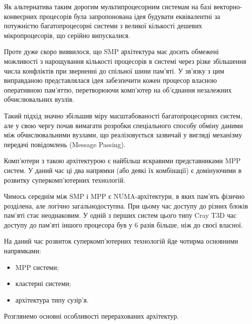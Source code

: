 Як альтернатива таким дорогим мультипроцесорним системам на базі век\-тор\-но-кон\-ве\-єр\-них процесорів була запропонована ідея будувати еквівалентні за потужністю багатопроцесорні системи з великої кількості дешевих мікропроцесорів, що серійно випускалися.

Проте дуже скоро виявилося, що SMP архітектура має досить обмежені можливості з нарощування кількості процесорів в системі через різке збільшення числа конфліктів при зверненні до спільної шини пам'яті.   
У зв'язку з цим виправданою представлялася ідея забезпечити кожен процесор власною оперативною пам'яттю, перетворюючи комп'ютер на об'єднання незалежних обчислювальних вузлів.   

Такий підхід значно збільшив міру масштабованості багатопроцесорних систем, але у свою чергу почав вимагати розробки спеціального способу обміну даними між обчислювальними вузлами, що реалізовується зазвичай у вигляді механізму передачі повідомлень (Message Passing).

Комп'ютери з такою архітектурою є найбільш яскравими представниками MPP систем. У даний час ці два напрямки (або деякі їх комбінації) є домінуючими в розвитку суперкомп'ютерних технологій.  

Чимось середнім між SMP і MPP є NUMA-архітектури, в яких пам'ять фізично розділена, але логічно загальнодоступна. При цьому час доступу до різних блоків пам'яті стає неоднаковим. У одній з перших систем цього типу Cray T3D час доступу до пам'яті іншого процесора був у 6 разів більше, ніж до своєї власної.

На даний час розвиток суперкомп'ютерних технологій йде чотирма основними напрямками: 

\begin{itemize}
\item MPP системи;
\item кластерні системи;
\item архітектура типу сузір'я. 
\end{itemize}

Розглянемо основні особливості перерахованих архітектур.

